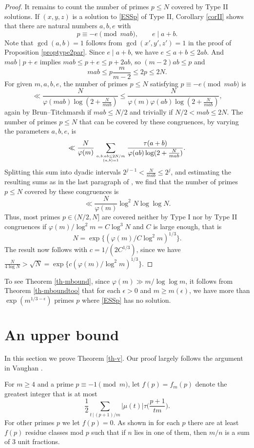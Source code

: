 \documentclass[12pt]{amsart}
\theoremstyle{definition}
\theoremstyle{remark}
\numberwithin{equation}{section}
\begin{document}
\begin{proof}
It remains to count the number of primes $p\le N$ covered by Type II solutions.
If $(x,y,z)$ is a solution to \eqref{ESSp} of Type II, Corollary \ref{corII} shows that there are natural numbers $a,b,e$ with
$$
p\equiv - e \pmod{mab}, \qquad e\mid a+b.
$$
Note that $\gcd(a,b)=1$ follows from $\gcd(x',y',z')=1$ in the proof of Proposition \ref{proptype2par}.
Since $e\mid a+b$, we have $e\le a+b \le 2ab$. And $mab\mid p+e$ implies $mab \le p+e \le p + 2ab$, so $(m-2) ab \le p$ and 
\begin{equation}\label{type2mabub}
mab \le p \frac{m}{m-2} \le 2p \le 2N.
\end{equation}
For given $m,a,b,e$, the number of primes $p\le N$ satisfying $p\equiv - e \pmod{mab}$ is 
$$
\ll \frac{N}{\varphi(mab) \log(2+\frac{N}{mab})}\le \frac{N}{\varphi(m) \varphi(ab) \log(2+\frac{N}{mab})},
$$
again by Brun--Titchmarsh if $mab\le N/2$ and trivially if $N/2 < mab \le 2N$. 
The number of primes $p\le N$ that can be covered by these congruences, by varying the parameters $a, b, e$, is
$$
\ll \frac{N}{\varphi(m)} \sum_{a,b: ab \le 2N/m \atop (a,b)=1} \frac{\tau(a+b)}{\varphi(ab)   \log(2+\frac{N}{mab})}.
$$
Splitting this sum into dyadic intervals $2^{j-1}< \frac{N}{mab} \le 2^{j}$,
and estimating the resulting sums as in the last paragraph of \cite[Section 9]{ET}, we find that  
the number of primes $p\le N$ covered by these congruences is 
$$
\ll \frac{N}{\varphi(m)} \log^2 N \log\log N.
$$
Thus, most primes $p\in (N/2,N]$ are covered neither by Type I nor by Type II congruences if $\varphi(m)/\log^2 m= C \log^3 N$ and $C$ is large enough, that is
$$
N = \exp\{ (\varphi(m)/C\log^2 m)^{1/3}\}.
$$ 
The result now follows with $c=1/(2C^{1/3})$,
since we have $\frac{N}{4\log N} >\sqrt{N}= \exp\{c (\varphi(m)/\log^2 m)^{1/3}\}$.
\end{proof}

To see Theorem \ref{th-mbound},  since $\varphi(m)\gg m/\log\log m$, it follows 
from Theorem \ref{th-mboundtoo} that for each $\epsilon>0$
and $m\ge m(\epsilon)$, we have more than $\exp(m^{1/3-\epsilon})$ primes $p$
where \eqref{ESSp} has no solution.  


\section{An upper bound}
In this section we prove Theorem \ref{th-v}.
Our proof largely follows the argument in Vaughan \cite{V}.

For $m\ge4$ and a prime $p\equiv-1\pmod m$, let $f(p)=f_m(p)$ denote the greatest
integer that is at most
\begin{equation}
\label{eq:vsum}
\frac12 \sum_{t\,|\,(p+1)/m}|\mu(t)|\tau\Big(\frac{p+1}{tm}\Big).
\end{equation}
For other primes $p$ we let $f(p)=0$.  As shown in \cite{V} for each $p$ there
are at least $f(p)$ residue classes mod $p$ such that if $n$ lies in one of them, then
$m/n$ is a sum of 3 unit fractions.  
\end{document}
